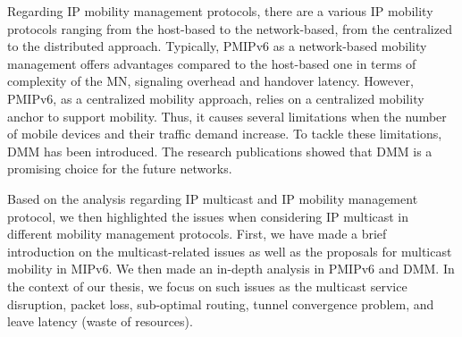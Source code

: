 Regarding IP mobility management protocols, there are a various IP mobility protocols ranging from the host-based to the network-based, from the centralized to the distributed approach. Typically, PMIPv6 as a network-based mobility management offers advantages compared to the host-based one in terms of complexity of the MN, signaling overhead and handover latency. However, PMIPv6, as a centralized mobility approach, relies on a centralized mobility anchor to support mobility. Thus, it causes several limitations when the number of mobile devices and their traffic demand increase. To tackle these limitations, DMM has been introduced. The research publications showed that DMM is a promising choice for the future networks. 

Based on the analysis regarding IP multicast and IP mobility management protocol, we then highlighted the issues when considering IP multicast in different mobility management protocols. First, we have made a brief introduction on the multicast-related issues as well as the proposals for multicast mobility in MIPv6. We then made an in-depth analysis in PMIPv6 and DMM. In the context of our thesis, we focus on such issues as the multicast service disruption, packet loss, sub-optimal routing, tunnel convergence problem, and leave latency (waste of resources).  
